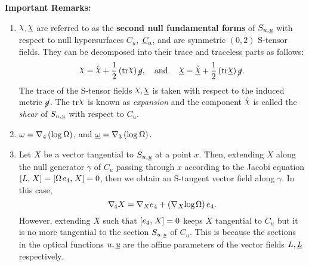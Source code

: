\documentclass[12pt, a4paper]{report}
\theoremstyle{bfnote}
\newcommand{\underit}[1]{\textit{\underbar{#1}}}
\newcommand{\chits}{\raisebox{0.5ex}{$\chi$}} %
\begin{document}
\textbf{Important Remarks:}
\begin{enumerate}[leftmargin=*, label={\bfseries{(\roman*)}}]
    \item $\mathbf{\chits, \underit{\chits}}$ are referred to as the \textbf{second null
    fundamental forms} of $S_{u, \underit{u}}$ with respect to null hypersurfaces
    $C_u$, $\underit{C}_u$, and are symmetric $\left(0, 2\right)$ S-tensor
    fields. They can be decomposed into their trace and traceless parts as
    follows:
    \begin{equation}{\label{eq:chidecomposition}}
        \chits = \hat{\chits} + \frac{1}{2}\left(\mathrm{tr}\chits\right)\cancel{g}, \quad \text{and } \quad \underit{\chits} = \hat{\underit{\chits}} + \frac{1}{2}\left(\mathrm{tr}\underit{\chits}\right)\cancel{g}.
    \end{equation}
    The trace of the S-tensor fields $\chits, \underit{\chits}$ is taken with
    respect to the induced metric $\cancel{g}$. The $\mathrm{tr}\chits$ is known
    as \textit{expansion} and the component $\hat{\chits}$ is called the
    \textit{shear} of $S_{u,\underit{u}}$ with respect to $C_u$.
    
    \item $\omega = \nabla_4\left(\mathrm{log}\hspace{0.2em}\Omega\right)$, and
    $\underit{$\omega$} =
    \nabla_3\left(\mathrm{log}\hspace{0.2em}\Omega\right)$.

    \item Let $X$ be a vector tangential to $S_{u, \underit{u}}$ at a point $x$.
    Then, extending $X$ along the null generator $\gamma$ of $C_u$ passing
    through $x$ according to the Jacobi equation $[L, \hspace{0.1em}X] =
    [\Omega\hspace{0.1em}e_4, \hspace{0.1em}X] = 0$, then we obtain an S-tangent
    vector field along $\gamma$. In this case,
    \begin{equation*}
        \nabla_{\hspace{-0.1em}4} X = \nabla_X e_4 + \left(\nabla_X\mathrm{log}\hspace{0.1em}\Omega\right)e_4.
    \end{equation*}
    However, extending $X$ such that $[e_4, \hspace{0.1em}X] = 0$ keeps $X$
    tangential to $C_u$ but it is no more tangential to the section $S_{u,
    \underit{u}}$ of $C_u$. This is because the sections in the optical
    functions $u, \underit{u}$ are the affine parameters of the vector fields
    $L, \underit{L}$ respectively.


\end{enumerate}
\end{document}
